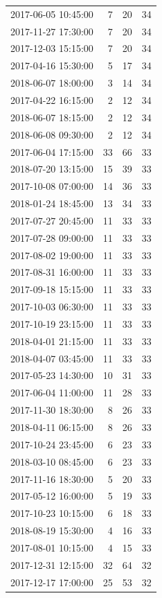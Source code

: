 \begin{tabular}{lrrr}
2017-06-05 10:45:00 & 7 & 20 & 34 \\
2017-11-27 17:30:00 & 7 & 20 & 34 \\
2017-12-03 15:15:00 & 7 & 20 & 34 \\
2017-04-16 15:30:00 & 5 & 17 & 34 \\
2018-06-07 18:00:00 & 3 & 14 & 34 \\
2017-04-22 16:15:00 & 2 & 12 & 34 \\
2018-06-07 18:15:00 & 2 & 12 & 34 \\
2018-06-08 09:30:00 & 2 & 12 & 34 \\
2017-06-04 17:15:00 & 33 & 66 & 33 \\
2018-07-20 13:15:00 & 15 & 39 & 33 \\
2017-10-08 07:00:00 & 14 & 36 & 33 \\
2018-01-24 18:45:00 & 13 & 34 & 33 \\
2017-07-27 20:45:00 & 11 & 33 & 33 \\
2017-07-28 09:00:00 & 11 & 33 & 33 \\
2017-08-02 19:00:00 & 11 & 33 & 33 \\
2017-08-31 16:00:00 & 11 & 33 & 33 \\
2017-09-18 15:15:00 & 11 & 33 & 33 \\
2017-10-03 06:30:00 & 11 & 33 & 33 \\
2017-10-19 23:15:00 & 11 & 33 & 33 \\
2018-04-01 21:15:00 & 11 & 33 & 33 \\
2018-04-07 03:45:00 & 11 & 33 & 33 \\
2017-05-23 14:30:00 & 10 & 31 & 33 \\
2017-06-04 11:00:00 & 11 & 28 & 33 \\
2017-11-30 18:30:00 & 8 & 26 & 33 \\
2018-04-11 06:15:00 & 8 & 26 & 33 \\
2017-10-24 23:45:00 & 6 & 23 & 33 \\
2018-03-10 08:45:00 & 6 & 23 & 33 \\
2017-11-16 18:30:00 & 5 & 20 & 33 \\
2017-05-12 16:00:00 & 5 & 19 & 33 \\
2017-10-23 10:15:00 & 6 & 18 & 33 \\
2018-08-19 15:30:00 & 4 & 16 & 33 \\
2017-08-01 10:15:00 & 4 & 15 & 33 \\
2017-12-31 12:15:00 & 32 & 64 & 32 \\
2017-12-17 17:00:00 & 25 & 53 & 32 \\

\end{tabular}
